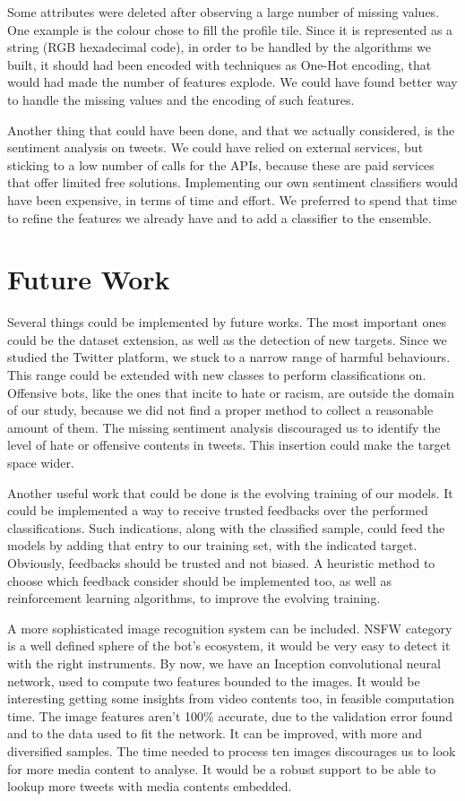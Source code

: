 Some attributes were deleted after observing a large number of missing values. One example is the colour chose to fill the profile tile. Since it is represented as a string (RGB hexadecimal code), in order to be handled by the algorithms we built, it should had been encoded with techniques as One-Hot encoding, that would had made the number of features explode. We could have found better way to handle the missing values and the encoding of such features.

Another thing that could have been done, and that we actually considered, is the sentiment analysis on tweets. We could have relied on external services, but sticking to a low number of calls for the APIs, because these are paid services that offer limited free solutions. Implementing our own sentiment classifiers would have been expensive, in terms of time and effort. We preferred to spend that time to refine the features we already have and to add a classifier to the ensemble.

\section{Future Work}
Several things could be implemented by future works. The most important ones could be the dataset extension, as well as the detection of new targets.
Since we studied the Twitter platform, we stuck to a narrow range of harmful behaviours. This range could be extended with new classes to perform classifications on. Offensive bots, like the ones that incite to hate or racism, are outside the domain of our study, because we did not find a proper method to collect a reasonable amount of them. The missing sentiment analysis discouraged us to identify the level of hate or offensive contents in tweets. This insertion could make the target space wider.

Another useful work that could be done is the evolving training of our models. It could be implemented a way to receive trusted feedbacks over the performed classifications. Such indications, along with the classified sample, could feed the models by adding that entry to our training set, with the indicated target. Obviously, feedbacks should be trusted and not biased. A heuristic method to choose which feedback consider should be implemented too, as well as reinforcement learning algorithms, to improve the evolving training.

A more sophisticated image recognition system can be included. NSFW category is a well defined sphere of the bot's ecosystem, it would be very easy to detect it with the right instruments. By now, we have an Inception convolutional neural network, used to compute two features bounded to the images. It would be interesting getting some insights from video contents too, in feasible computation time. The image features aren't 100\% accurate, due to the validation error found and to the data used to fit the network. It can be improved, with more and diversified samples. The time needed to process ten images discourages us to look for more media content to analyse. It would be a robust support to be able to lookup more tweets with media contents embedded.

